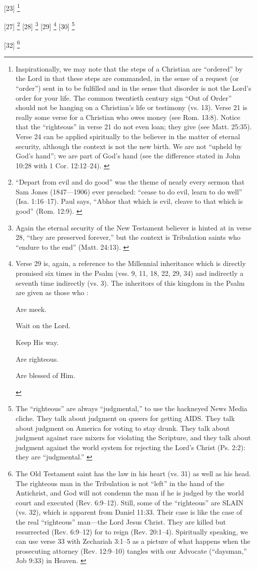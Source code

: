 [23] \footnote{Inspirationally, we may note that the steps of a Christian are “ordered” by the Lord in that these steps are commanded, in the sense of a request (or “order”) sent in to be fulfilled and in the sense that disorder is not the Lord’s order for your life. The common twentieth century sign “Out of Order” should not be hanging on a Christian’s life or testimony (vs. 13). Verse 21 is really some verse for a Christian who owes money (see Rom. 13:8). Notice that the “righteous” in verse 21 do not even loan; they give (see Matt. 25:35). Verse 24 can be applied spiritually to the believer in the matter of eternal security, although the context is not the new birth. We are not “upheld by God’s hand”; we are part of God’s hand (see the difference stated in John 10:28 with 1 Cor. 12:12–24). \cite{Ruckman1992Psalms}}

[27] \footnote{``Depart from evil and do good'' was the theme of nearly every sermon that Sam Jones (1847--–1906) ever preached: ``cease to do evil, learn to do well'' (Isa. 1:16--17). Paul says, ``Abhor that which is evil, cleave to that which is good'' (Rom. 12:9). \cite{Ruckman1992Psalms}}
[28] \footnote{Again the eternal security of the New Testament believer is hinted at in verse 28, “they are preserved forever,” but the context is Tribulation saints who “endure to the end” (Matt. 24:13). \cite{Ruckman1992Psalms}}
[29] \footnote{Verse 29 is, again, a reference to the Millennial inheritance which is directly promised six times in the Psalm (vss. 9, 11, 18, 22, 29, 34) and indirectly a seventh time indirectly (vs. 3). The inheritors of this kingdom in the Psalm are given as those who \cite{Ruckman1992Psalms}:
\begin{compactenum}
\item Are meek.
\item Wait on the Lord.
\item Keep His way.
\item Are righteous.
\item Are blessed of Him.
\end{compactenum}}
[30] \footnote{The “righteous” are always “judgmental,” to use the hackneyed News Media cliche. They talk about judgment on queers for getting AIDS. They talk about judgment on America for voting to stay drunk. They talk about judgment against race mixers for violating the Scripture, and they talk about judgment against the world system for rejecting the Lord’s Christ (Ps. 2:2): they are “judgmental.” \cite{Ruckman1992Psalms}}

[32] \footnote{The Old Testament saint has the law in his heart (vs. 31) as well as his head. The righteous man in the Tribulation is not “left” in the hand of the Antichrist, and God will not condemn the man if he is judged by the world court and executed (Rev. 6:9–12). Still, some of the “righteous” are SLAIN (vs. 32), which is apparent from Daniel 11:33. Their case is like the case of the real “righteous” man—the Lord Jesus Christ. They are killed but resurrected (Rev. 6:9–12) for to reign (Rev. 20:1–4). Spiritually speaking, we can use verse 33 with Zechariah 3:1–5 as a picture of what happens when the prosecuting attorney (Rev. 12:9–10) tangles with our Advocate (“daysman,” Job 9:33) in Heaven. \cite{Ruckman1992Psalms}}


